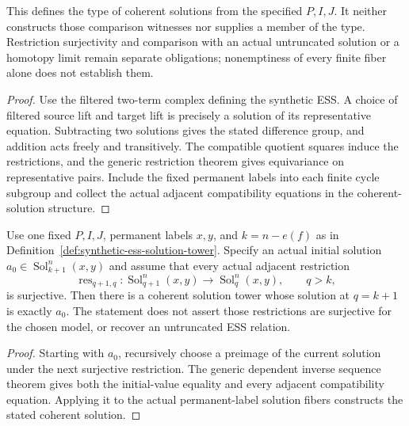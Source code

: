 \begin{definition}
  This defines the type of coherent solutions from the specified $P,I,J$.
  It neither constructs those comparison witnesses nor supplies a member
  of the type.  Restriction surjectivity and comparison with an actual
  untruncated solution or a homotopy limit remain separate obligations;
  nonemptiness of every finite fiber alone does not establish them.
\end{definition}

\begin{proof}
  \leanok
  Use the filtered two-term complex defining the synthetic ESS.  A choice of
  filtered source lift and target lift is precisely a solution of its
  representative equation.  Subtracting two solutions gives the stated
  difference group, and addition acts freely and transitively.  The compatible
  quotient squares induce the restrictions, and the generic restriction
  theorem gives equivariance on representative pairs.  Include the fixed
  permanent labels into each finite cycle subgroup and collect the actual
  adjacent compatibility equations in the coherent-solution structure.
\end{proof}

\begin{proposition}
  \label{prop:synthetic-ess-coherent-tower-of-surjective}
  \leanok
  Use one fixed $P,I,J$, permanent labels $x,y$, and $k=n-e(f)$ as in
  Definition~\ref{def:synthetic-ess-solution-tower}.  Specify an actual
  initial solution $a_0\in\operatorname{Sol}_{k+1}^n(x,y)$ and assume
  that every actual adjacent restriction
  \[
    \operatorname{res}_{q+1,q}:\operatorname{Sol}_{q+1}^n(x,y)
      \longrightarrow\operatorname{Sol}_q^n(x,y),\qquad q>k,
  \]
  is surjective.  Then there is a coherent solution tower whose solution
  at $q=k+1$ is exactly $a_0$.
  The statement does not assert those restrictions are surjective for the
  chosen model, or recover an untruncated ESS relation.
\end{proposition}
\begin{proof}
  \leanok
  Starting with $a_0$, recursively choose a preimage of the current solution
  under the next surjective restriction.  The generic dependent inverse
  sequence theorem gives both the initial-value equality and every adjacent
  compatibility equation.  Applying it to the actual permanent-label
  solution fibers constructs the stated coherent solution.
\end{proof}

